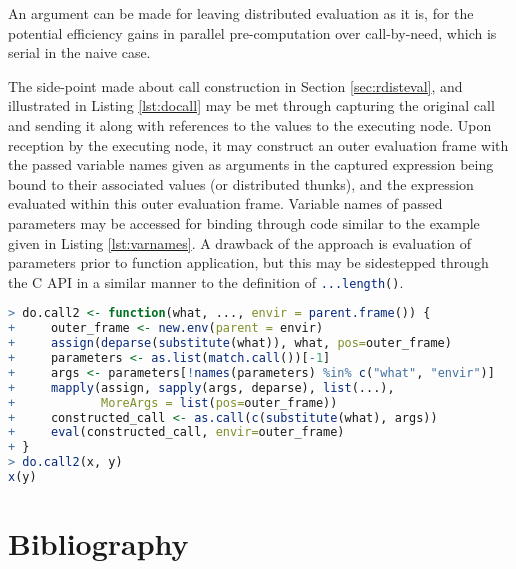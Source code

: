 \documentclass[10pt,a4paper]{article}
\begin{document}
An argument can be made for leaving distributed evaluation as it is, for the potential efficiency gains in parallel pre-computation over call-by-need, which is serial in the naive case.

The side-point made about call construction in Section \ref{sec:rdisteval}, and illustrated in Listing \ref{lst:docall} may be met through capturing the original call and sending it along with references to the values to the executing node.
Upon reception by the executing node, it may construct an outer evaluation frame with the passed variable names given as arguments in the captured expression being bound to their associated values (or distributed thunks), and the expression evaluated within this outer evaluation frame.
Variable names of passed parameters may be accessed for binding through code similar to the example given in Listing \ref{lst:varnames}.
A drawback of the approach is evaluation of parameters prior to function application, but this may be sidestepped through the C API in a similar manner to the definition of \lstinline[language=R]{...length()}.

\begin{lstlisting}[language=R,float,caption={Access to variable names given as formal parameters to a function call using x and y as defined in Listing \ref{lst:docall}},label=lst:varnames]
> do.call2 <- function(what, ..., envir = parent.frame()) {
+     outer_frame <- new.env(parent = envir)
+     assign(deparse(substitute(what)), what, pos=outer_frame)
+     parameters <- as.list(match.call())[-1]
+     args <- parameters[!names(parameters) %in% c("what", "envir")]
+     mapply(assign, sapply(args, deparse), list(...),
+            MoreArgs = list(pos=outer_frame))
+     constructed_call <- as.call(c(substitute(what), args))
+     eval(constructed_call, envir=outer_frame)
+ }
> do.call2(x, y)
x(y)
\end{lstlisting}

\section{Bibliography}



\end{document}
